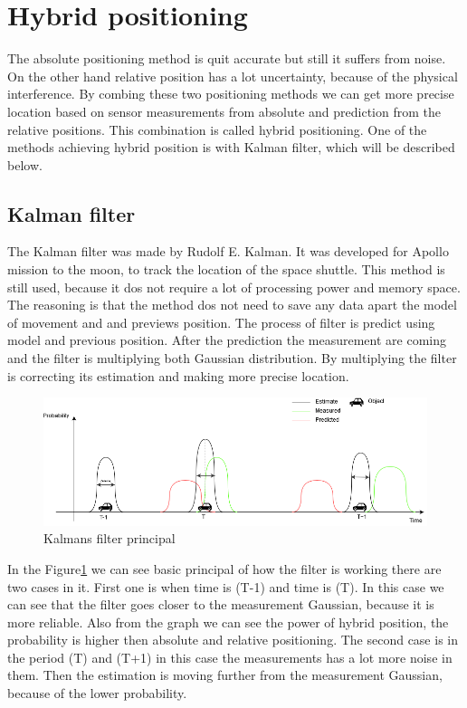 
\section{Hybrid positioning}

The absolute positioning method is quit accurate but still it suffers from noise. On the other hand relative position has a lot uncertainty, because of the physical interference. By combing these two positioning methods we can get more precise location based on sensor measurements from absolute and prediction from the relative positions. This combination is called hybrid positioning. One of the methods achieving hybrid position is with Kalman filter, which will be described below.

\subsection{Kalman filter}

The Kalman filter was made by Rudolf E. Kalman. It was developed for Apollo mission to the moon, to track the location of the space shuttle. This method is still used, because it dos not require a lot of processing power and memory space. The reasoning is that the method dos not need to save any data apart the model of movement and and previews position. The process of filter is predict using model and previous position. After the prediction the measurement are coming and the filter is multiplying both Gaussian distribution. By multiplying the filter is correcting its estimation and making more precise location.

	\begin{figure}
	\centering
	\includegraphics[width=0.7\linewidth]{positioning/positioning/DiagramKalman}
	\caption{Kalmans filter principal}
	\label{fig:Kalmanfilter}
	\end{figure}

In the Figure\ref{fig:Kalmanfilter} we can see basic principal of how the filter is working there are two cases in it. First one is when time is (T-1) and time is (T). In this case we can see that the filter goes closer to the measurement Gaussian, because it is more reliable. Also from the graph we can see the power of hybrid position, the probability is higher then absolute and relative positioning. The second case is in the period (T) and (T+1) in this case the measurements has a lot more noise in them. Then the estimation is moving further from the measurement Gaussian, because of the lower probability. 
